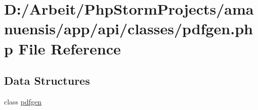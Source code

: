 \hypertarget{pdfgen_8php}{}\section{D\+:/\+Arbeit/\+Php\+Storm\+Projects/amanuensis/app/api/classes/pdfgen.php File Reference}
\label{pdfgen_8php}
\subsection*{Data Structures}
\begin{DoxyCompactItemize}
\item 
class \hyperlink{classpdfgen}{pdfgen}
\end{DoxyCompactItemize}
